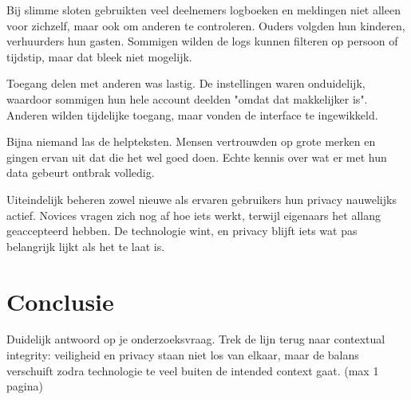 \documentclass[nonacm,sigconf]{acmart}
\begin{document}
    Bij slimme sloten gebruikten veel deelnemers logboeken en meldingen niet alleen voor zichzelf, maar ook om anderen te controleren.
    Ouders volgden hun kinderen, verhuurders hun gasten.
    Sommigen wilden de logs kunnen filteren op persoon of tijdstip, maar dat bleek niet mogelijk.

    Toegang delen met anderen was lastig.
    De instellingen waren onduidelijk, waardoor sommigen hun hele account deelden "omdat dat makkelijker is".
    Anderen wilden tijdelijke toegang, maar vonden de interface te ingewikkeld.

    Bijna niemand las de helpteksten.
    Mensen vertrouwden op grote merken en gingen ervan uit dat die het wel goed doen.
    Echte kennis over wat er met hun data gebeurt ontbrak volledig.

    Uiteindelijk beheren zowel nieuwe als ervaren gebruikers hun privacy nauwelijks actief.
    Novices vragen zich nog af hoe iets werkt, terwijl eigenaars het allang geaccepteerd hebben.
    De technologie wint, en privacy blijft iets wat pas belangrijk lijkt als het te laat is.

    \section{Conclusie}
    Duidelijk antwoord op je onderzoeksvraag.
    Trek de lijn terug naar contextual integrity: veiligheid en privacy staan niet los van elkaar, maar de balans verschuift zodra technologie te veel buiten de intended context gaat. (max 1 pagina)

    \printbibliography

    \balance %
\end{document}
